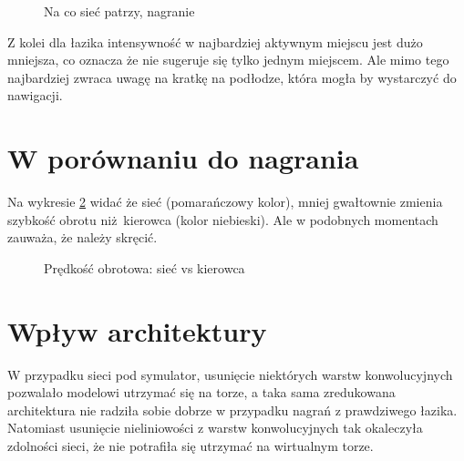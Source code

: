 \begin{figure}
  \centering
  \label{real_act}
  \caption{Na co sieć patrzy, nagranie}
\end{figure}

Z kolei dla łazika intensywność w najbardziej aktywnym miejscu jest dużo mniejsza,
co oznacza że nie sugeruje się tylko jednym miejscem. Ale mimo tego najbardziej 
zwraca uwagę na kratkę na podłodze, która mogła by wystarczyć do nawigacji.

\section{W porównaniu do nagrania}
Na wykresie \ref{plot_ang} widać że sieć (pomarańczowy kolor), mniej gwałtownie 
zmienia szybkość obrotu niż kierowca (kolor niebieski). Ale w podobnych momentach
zauważa, że należy skręcić.
\begin{figure}
  \centering
  \label{plot_ang}
  \caption{Prędkość obrotowa: sieć vs kierowca}
\end{figure}

\section{Wpływ architektury}
W przypadku sieci pod symulator, usunięcie niektórych warstw konwolucyjnych
pozwalało modelowi utrzymać się na torze, a taka sama zredukowana architektura 
nie radziła sobie dobrze w przypadku nagrań z prawdziwego łazika. Natomiast
usunięcie nieliniowości z warstw konwolucyjnych tak okaleczyła zdolności sieci,
że nie potrafiła się utrzymać na wirtualnym torze.

